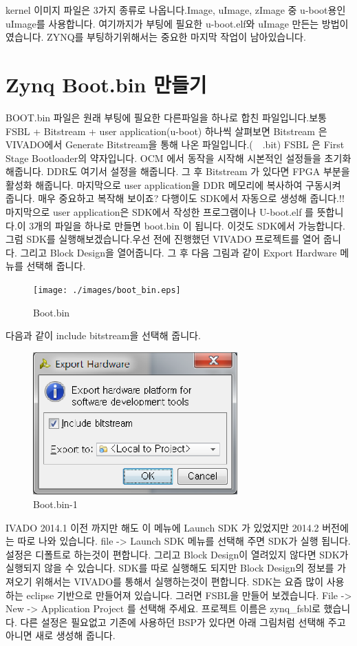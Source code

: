 \documentclass[11pt
  , a4paper
  , article
  , oneside
]{memoir}
\begin{document}
kernel 이미지 파일은 3가지 종류로 나옵니다.Image, uImage, zImage 중 u-boot용인 uImage를 사용합니다. 여기까지가 부팅에 필요한 u-boot.elf와 uImage 만든는 방법이였습니다. ZYNQ를 부팅하기위해서는 중요한 마지막 작업이 남아있습니다.

\section{Zynq Boot.bin 만들기}

BOOT.bin 파일은 원래 부팅에 필요한 다른파일을 하나로 합친 파일입니다.보통 FSBL + Bitstream + user application(u-boot) 하나씩 살펴보면 Bitstream 은 VIVADO에서 Generate Bitstream을 통해 나온 파일입니다.(~~.bit) FSBL 은 First Stage Bootloader의 약자입니다. OCM 에서 동작을 시작해 시본적인 설정들을 초기화 해줍니다. DDR도 여기서 설정을 해줍니다.  그 후 Bitstream 가 있다면 FPGA 부분을 활성화 해줍니다. 마지막으로 user application을 DDR 메모리에 복사하여 구동시켜 줍니다.
매우 중요하고 복작해 보이죠? 다행이도 SDK에서 자동으로 생성해 줍니다.!!마지막으로 user application은 SDK에서 작성한 프로그램이나 U-boot.elf 를 뜻합니다.이 3개의 파일을 하나로 만들면 boot.bin 이 됩니다. 이것도 SDK에서 가능합니다. 그럼 SDK를 실행해보겠습니다.우선 전에 진행했던 VIVADO 프로젝트를 열어 줍니다. 그리고 Block Design을 열어줍니다. 그 후 다음 그림과 같이 Export Hardware 메뉴를 선택해 줍니다.

\begin{figure}[h!]
	\centering
	\texttt{[image: ./images/boot\_bin.eps]}
	\caption{Boot.bin}
	\label{fig:boot.bin} 
\end{figure}
다음과 같이 include bitstream을 선택해 줍니다.

\begin{figure}[h!]
	\centering
	\includegraphics[width=0.7\textwidth]{./images/boot_bin_1.eps}
	\caption{Boot.bin-1}
	\label{fig:boot.bin.1} 
\end{figure}
IVADO 2014.1 이전 까지만 해도 이 메뉴에 Launch SDK 가 있었지만 2014.2 버전에는 따로 나와 있습니다. file -> Launch SDK 메뉴를 선택해 주면 SDK가 실행 됩니다. 설정은 디폴트로 하는것이 편합니다. 그리고 Block Design이 열려있지 않다면 SDK가 실행되지 않을 수 있습니다. SDK를 따로 실행해도 되지만 Block Design의 정보를 가져오기 위해서는 VIVADO를 통해서 실행하는것이 편합니다.
SDK는 요즘 많이 사용하는 eclipse 기반으로 만들어져 있습니다. 그러면 FSBL을 만들어 보겠습니다. File -> New -> Application Project 를 선택해 주세요. 프로젝트 이름은 zynq\_fsbl로 했습니다. 다른 설정은 필요없고 기존에 사용하던 BSP가 있다면 아래 그림처럼 선택해 주고 아니면 새로 생성해 줍니다.
\end{document}
